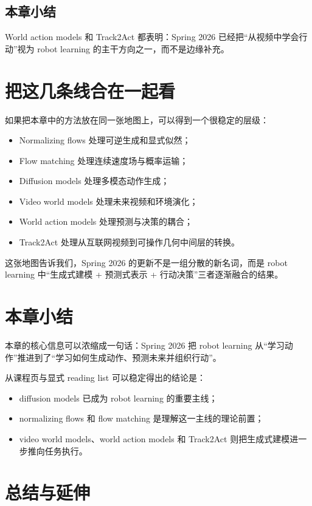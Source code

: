 \documentclass[a4paper]{article}
\begin{document}
\subsection{本章小结}

World action models 和 Track2Act 都表明：Spring 2026 已经把“从视频中学会行动”视为 robot learning 的主干方向之一，而不是边缘补充。

\section{把这几条线合在一起看}

如果把本章中的方法放在同一张地图上，可以得到一个很稳定的层级：
\begin{itemize}
  \item Normalizing flows 处理可逆生成和显式似然；
  \item Flow matching 处理连续速度场与概率运输；
  \item Diffusion models 处理多模态动作生成；
  \item Video world models 处理未来视频和环境演化；
  \item World action models 处理预测与决策的耦合；
  \item Track2Act 处理从互联网视频到可操作几何中间层的转换。
\end{itemize}

这张地图告诉我们，Spring 2026 的更新不是一组分散的新名词，而是 robot learning 中“生成式建模 + 预测式表示 + 行动决策”三者逐渐融合的结果。

\section{本章小结}

本章的核心信息可以浓缩成一句话：Spring 2026 把 robot learning 从“学习动作”推进到了“学习如何生成动作、预测未来并组织行动”。

从课程页与显式 reading list 可以稳定得出的结论是：
\begin{itemize}
  \item diffusion models 已成为 robot learning 的重要主线；
  \item normalizing flows 和 flow matching 是理解这一主线的理论前置；
  \item video world models、world action models 和 Track2Act 则把生成式建模进一步推向任务执行。
\end{itemize}

\section{总结与延伸}
\end{document}
